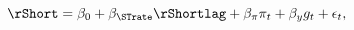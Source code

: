 \begin{equation} \label{eq:nTaylorRule}
	\rShort = \beta_{0} + \beta_{\STrate} \rShortlag + \beta_{\pi} \pi_{t} + \beta_{y} g_{t} + \epsilon_{t},
\end{equation}